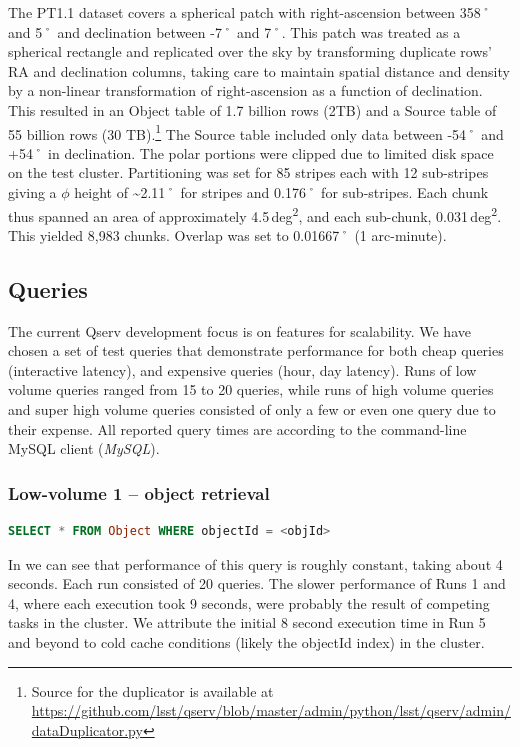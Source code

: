\documentclass[DM,toc]{lsstdoc}
\begin{document}
The PT1.1 dataset covers a spherical patch with right-ascension between
358˚ and 5˚ and declination between -7˚ and 7˚. This patch was treated
as a spherical rectangle and replicated over the sky by transforming
duplicate rows' RA and declination columns, taking care to maintain
spatial distance and density by a non-linear transformation of
right-ascension as a function of declination. This resulted in an Object
table of 1.7 billion rows (2TB) and a Source table of 55 billion rows
(30 TB).\footnote{Source for the duplicator is available at
  \url{https://github.com/lsst/qserv/blob/master/admin/python/lsst/qserv/admin/dataDuplicator.py}}
The Source table included only data between -54˚ and +54˚ in
declination. The polar portions were clipped due to limited disk space
on the test cluster. Partitioning was set for 85 stripes each with 12
sub-stripes giving a $\phi$ height of \textasciitilde{}2.11˚ for stripes and
0.176˚ for sub-stripes. Each chunk thus spanned an area of approximately
4.5\,deg\textsuperscript{2}, and each sub-chunk,
0.031\,deg\textsuperscript{2}. This yielded 8,983 chunks. Overlap was set
to 0.01667˚ (1 arc-minute).

\subsection{Queries}\label{queries}

The current Qserv development focus is on features for scalability. We
have chosen a set of test queries that demonstrate performance for both
cheap queries (interactive latency), and expensive queries (hour, day
latency). Runs of low volume queries ranged from 15 to 20 queries, while
runs of high volume queries and super high volume queries consisted of
only a few or even one query due to their expense. All reported query
times are according to the command-line MySQL client (\emph{MySQL}).

\subsubsection{Low-volume 1 -- object
retrieval}\label{low-volume-1-object-retrieval}

\begin{lstlisting}[language=SQL]
SELECT * FROM Object WHERE objectId = <objId>
\end{lstlisting}

In  we can see that performance of
this query is roughly constant, taking about 4 seconds. Each run
consisted of 20 queries. The slower performance of Runs 1 and 4, where
each execution took 9 seconds, were probably the result of competing
tasks in the cluster. We attribute the initial 8 second execution time
in Run 5 and beyond to cold cache conditions (likely the objectId index)
in the cluster.
\end{document}
